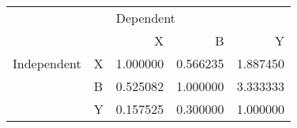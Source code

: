 \begin{tabular}{llrrr}
\toprule
            &   & \multicolumn{3}{l}{Dependent} \\
            &   &         X &         B &         Y \\
\midrule
Independent & X &  1.000000 &  0.566235 &  1.887450 \\
            & B &  0.525082 &  1.000000 &  3.333333 \\
            & Y &  0.157525 &  0.300000 &  1.000000 \\
\bottomrule
\end{tabular}
